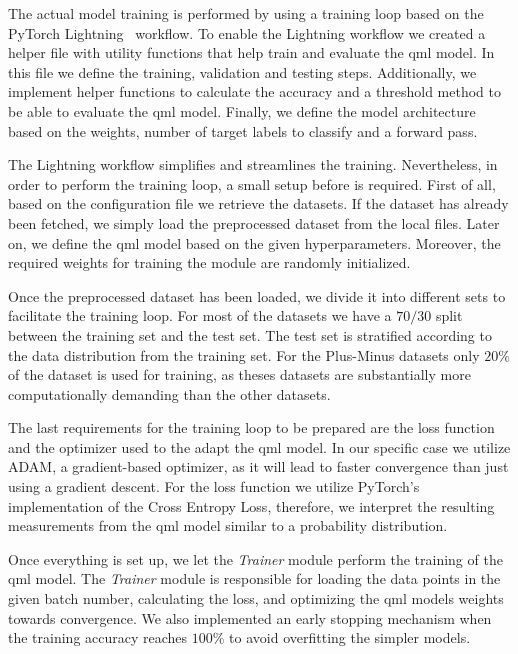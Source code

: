 The actual model training is performed by using a training loop
based on the PyTorch Lightning~\cite{falcon_pytorch_2019} workflow.
To enable the Lightning workflow we created a helper file with
utility functions that help train and evaluate the \ac{qml} model.
In this file we define the training, validation and testing steps.
Additionally, we implement helper functions to calculate the 
accuracy and a threshold method to be able to evaluate the \ac{qml}
model. Finally, we define the model architecture based on the
weights, number of target labels to classify and a forward pass. \

The Lightning workflow simplifies and streamlines the training.
Nevertheless, in order to perform the training loop, a small
setup before is required. First of all, based on the configuration
file we retrieve the datasets. If the dataset has already been
fetched, we simply load the preprocessed dataset from the local files.
Later on, we define the \ac{qml} model based on the given hyperparameters.
Moreover, the required weights for training the module are randomly
initialized. \


Once the preprocessed dataset has been loaded, we divide it into
different sets to facilitate the training loop. For most of
the datasets we have a \(70/30\) split between the training
set and the test set. The test set is stratified according
to the data distribution from the training set. For the
Plus-Minus datasets only \(20\%\) of the dataset
is used for training, as theses datasets are substantially
more computationally demanding than the other datasets. \

The last requirements for the training loop to be prepared are the
loss function and the optimizer used to the adapt the \ac{qml} model. In our
specific case we utilize ADAM, a gradient-based optimizer, as it will
lead to faster convergence than just using a gradient descent. For the
loss function we utilize PyTorch's implementation of the Cross Entropy
Loss, therefore, we interpret the resulting measurements from the
\ac{qml} model similar to a probability distribution.  \

Once everything is set up, we let the \textit{Trainer} module
perform the training of the \ac{qml} model. The \textit{Trainer}
module is responsible for loading the data points in the given
batch number, calculating the loss, and optimizing the \ac{qml}
models weights towards convergence. We also implemented an early
stopping mechanism when the training accuracy reaches \(100\%\)
to avoid overfitting the simpler models. \

